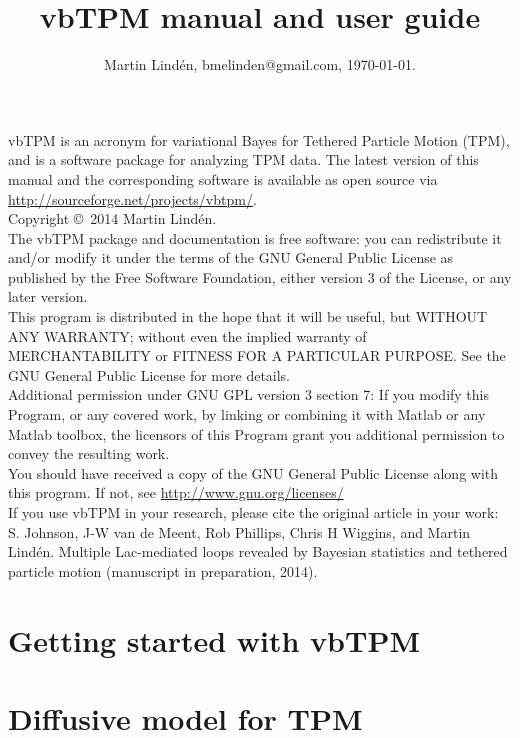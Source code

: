 \documentclass[11pt,letterpaper,twocolumn]{article}
\title{vbTPM manual and user guide}
\author{Martin Lind\'en, bmelinden@gmail.com, \today.}
\date{}
\begin{document}
\onecolumn
\maketitle 
\noindent 
vbTPM is an acronym for variational Bayes for Tethered Particle Motion
(TPM), and is a software package for analyzing TPM data.  The latest
version of this manual and the corresponding software is available as
open source via \url{http://sourceforge.net/projects/vbtpm/}. \bigskip\\
\noindent Copyright \copyright~2014 Martin Lindén. \smallskip\\
\noindent
The vbTPM package and documentation is free software: you can
redistribute it and/or modify it under the terms of the GNU General
Public License as published by the Free Software Foundation, either
version 3 of the License, or any later version.\smallskip\\
\noindent
This program is distributed in the hope that it will be useful, but
WITHOUT ANY WARRANTY; without even the implied warranty of
MERCHANTABILITY or FITNESS FOR A PARTICULAR PURPOSE. See the GNU
General Public License for more details.\smallskip\\
\noindent
Additional permission under GNU GPL version 3 section 7: If you modify
this Program, or any covered work, by linking or combining it with
Matlab or any Matlab toolbox, the licensors of this Program grant you
additional permission to convey the resulting work.\smallskip\\
\noindent 
You should have received a copy of the GNU General Public License
along with this program. If not, see \url{http://www.gnu.org/licenses/}
\bigskip\\
\noindent 
If you use vbTPM in your research, please cite the original article in
your work:
\medskip\\
\noindent 
S. Johnson, J-W van de Meent, Rob Phillips, Chris H Wiggins, and
Martin Lindén. Multiple Lac-mediated loops revealed by Bayesian
statistics and tethered particle motion (manuscript in preparation,
2014).


\twocolumn
\tableofcontents
\clearpage
\section{Getting started with vbTPM}

\section{Diffusive model for TPM}

\end{document}
